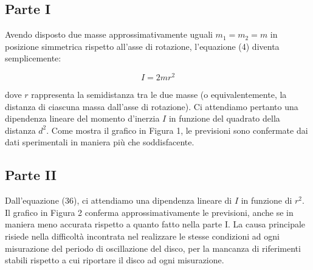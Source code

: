 

\subsection{Parte I} Avendo disposto due masse approssimativamente uguali $m_1 = m_2 = m$ in posizione simmetrica 
rispetto all'asse di rotazione, l'equazione (4) diventa semplicemente:

\begin{equation}
    I = 2mr^2
\end{equation}

dove $r$ rappresenta la semidistanza tra le due masse 
(o equivalentemente, la distanza di ciascuna massa dall'asse di rotazione). 
Ci attendiamo pertanto una dipendenza lineare del momento d'inerzia $I$ in 
funzione del quadrato della distanza $d^2$. Come mostra il grafico in Figura 1, 
le previsioni sono confermate dai dati sperimentali in maniera più che soddisfacente.

\subsection{Parte II}

Dall'equazione (36), ci attendiamo una dipendenza lineare di $I$ in funzione di $r^2$. 
Il grafico in Figura 2 conferma approssimativamente le previsioni, 
anche se in maniera meno accurata rispetto a quanto fatto nella parte I. 
La causa principale risiede nella difficoltà incontrata nel realizzare le stesse condizioni 
ad ogni misurazione del periodo di oscillazione del disco, per la mancanza di riferimenti 
stabili rispetto a cui riportare il disco ad ogni misurazione.